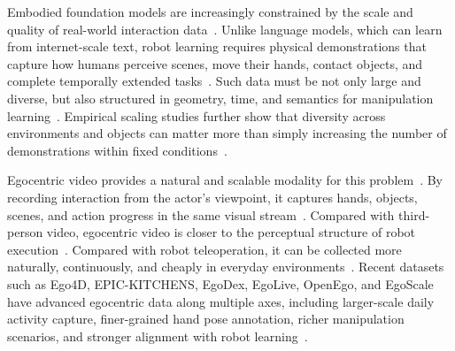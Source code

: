 

Embodied foundation models are increasingly constrained by the scale and quality of real-world interaction data~\cite{lindata,droid2024}.
Unlike language models, which can learn from internet-scale text, robot learning requires physical demonstrations that capture how humans perceive scenes, move their hands, contact objects, and complete temporally extended tasks~\cite{droid2024}.
Such data must be not only large and diverse, but also structured in geometry, time, and semantics for manipulation learning~\cite{droid2024}.
Empirical scaling studies further show that diversity across environments and objects can matter more than simply increasing the number of demonstrations within fixed conditions~\cite{lindata}.

Egocentric video provides a natural and scalable modality for this problem~\cite{grauman2022ego4d,damen2022rescaling}.
By recording interaction from the actor's viewpoint, it captures hands, objects, scenes, and action progress in the same visual stream~\cite{grauman2022ego4d,damen2022rescaling}.
Compared with third-person video, egocentric video is closer to the perceptual structure of robot execution~\cite{egodex2025,egoscale2026}.
Compared with robot teleoperation, it can be collected more naturally, continuously, and cheaply in everyday environments~\cite{aoe2026,droid2024}.
Recent datasets such as Ego4D, EPIC-KITCHENS, EgoDex, EgoLive, OpenEgo, and EgoScale have advanced egocentric data along multiple axes, including larger-scale daily activity capture, finer-grained hand pose annotation, richer manipulation scenarios, and stronger alignment with robot learning~\cite{grauman2022ego4d,damen2022rescaling,egodex2025,egolive2026,openegocentric2025,egoscale2026}.

